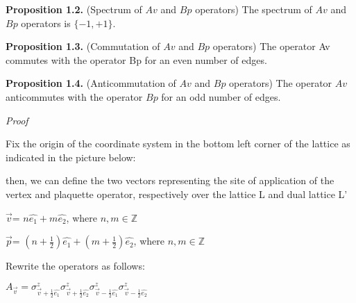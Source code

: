 \documentclass[12pt]{report}
\begin{document}
	\begin{minipage}{1\textwidth}
		
		
		\textbf{Proposition 1.2.} (Spectrum of $Av$ and $Bp$ operators) The spectrum of $Av$ and $Bp$ operators is $\{-1,+1\}$. \newline
		
	    
    	\textbf{Proposition 1.3.} (Commutation of $Av$ and $Bp$ operators) The operator Av commutes with the operator Bp for an even number of edges.
    	\newline
    	
    	\textbf{Proposition 1.4.} (Anticommutation of $Av$ and $Bp$ operators) The operator $Av$ anticommutes with the operator $Bp$ for an odd number of edges.
    	\newline
    	
    	\textit{Proof}\newline 
    	
    	Fix the origin of the coordinate system in the bottom left corner of the lattice as indicated in the picture below:\newline
    	
    	
    	then, we can define the two vectors representing the site of application of the vertex and plaquette operator, respectively over the lattice L and dual lattice L'
    	
    	\begin{center}
    		$\vec{v}$= $n\hat{e_1} + m\hat{e_2}$, where $n,m \in \mathbb{Z}$ \newline
    		
    		$\vec{p}$= $(n + \frac{1}{2}) \hat{e_1} + (m + \frac{1}{2}) \hat{e_2}$, where $n,m \in \mathbb{Z}$\newline
    	\end{center}
    	
    	Rewrite the operators as follows:\newline
    	
    	\begin{center}
    		
    		$A_{\vec{v}} = \sigma^z_{\vec{v}+\frac{1}{2}\hat{e_1}} \sigma^z_{\vec{v}+\frac{1}{2}\hat{e_2}} \sigma^z_{\vec{v}-\frac{1}{2}\hat{e_1}} \sigma^z_{\vec{v}-\frac{1}{2}\hat{e_2}}$ \newline
    		

\end{center}
\end{minipage}
\end{document}
